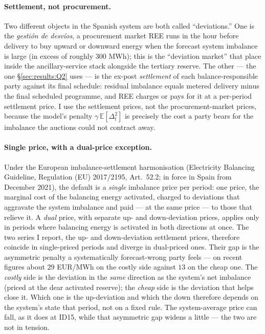 \documentclass[11pt,a4paper]{article}
\theoremstyle{definition}
\theoremstyle{remark}
\theoremstyle{plain}
\begin{document}
\paragraph{Settlement, not procurement.} Two different objects in the Spanish system are both called ``deviations.'' One is the \emph{gesti\'on de desv\'ios}, a procurement market REE runs in the hour before delivery to buy upward or downward energy when the forecast system imbalance is large (in excess of roughly $300$ MWh); this is the ``deviation market'' that \citet{brown_reguant_2026} place inside the ancillary-service stack alongside the tertiary reserve. The other --- the one \S\ref{sec:results:Q2} uses --- is the ex-post \emph{settlement} of each balance-responsible party against its final schedule: residual imbalance equals metered delivery minus the final scheduled programme, and REE charges or pays for it at a per-period settlement price. I use the settlement prices, not the procurement-market prices, because the model's penalty $\gamma\,\mathbb{E}[\Delta_t^2]$ is precisely the cost a party bears for the imbalance the auctions could not contract away.

\paragraph{Single price, with a dual-price exception.} Under the European imbalance-settlement harmonisation (Electricity Balancing Guideline, Regulation (EU) 2017/2195, Art.~52.2; in force in Spain from December 2021), the default is a \emph{single} imbalance price per period: one price, the marginal cost of the balancing energy activated, charged to deviations that aggravate the system imbalance and paid --- at the same price --- to those that relieve it. A \emph{dual} price, with separate up- and down-deviation prices, applies only in periods where balancing energy is activated in both directions at once. The two series I report, the up- and down-deviation settlement prices, therefore coincide in single-priced periods and diverge in dual-priced ones. Their gap is the asymmetric penalty a systematically forecast-wrong party feels --- on recent figures about $29$ EUR/MWh on the costly side against $13$ on the cheap one. The \emph{costly} side is the deviation in the \emph{same} direction as the system's net imbalance (priced at the dear activated reserve); the \emph{cheap} side is the deviation that helps close it. Which one is the up-deviation and which the down therefore depends on the system's state that period, not on a fixed rule. The system-average price can fall, as it does at ID15, while that asymmetric gap widens a little --- the two are not in tension.
\end{document}
